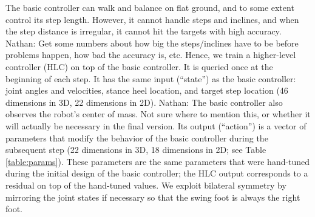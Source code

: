 \documentclass[a4paper]{article}
\newcommand{\nhatch}[1]{{\leavevmode\color{blue} Nathan: #1}}
\begin{document}
The basic controller can walk and balance on flat ground, and to some extent control its step length.
However, it cannot handle steps and inclines, and when the step distance is irregular, it cannot hit the targets with high accuracy.
\nhatch{Get some numbers about how big the steps/inclines have to be before problems happen, how bad the accuracy is, etc.}
Hence, we train a higher-level controller (HLC) on top of the basic controller.
It is queried once at the beginning of each step.
It has the same input (``state'') as the basic controller: joint angles and velocities, stance heel location, and target step location (46 dimensions in 3D, 22 dimensions in 2D).
\nhatch{The basic controller also observes the robot's center of mass. Not sure where to mention this, or whether it will actually be necessary in the final version.}
Its output (``action'') is a vector of parameters that modify the behavior of the basic controller during the subsequent step (22 dimensions in 3D, 18 dimensions in 2D; see Table \ref{table:params}).
These parameters are the same parameters that were hand-tuned during the initial design of the basic controller; the HLC output corresponds to a residual on top of the hand-tuned values.
We exploit bilateral symmetry by mirroring the joint states if necessary so that the swing foot is always the right foot.
\end{document}
